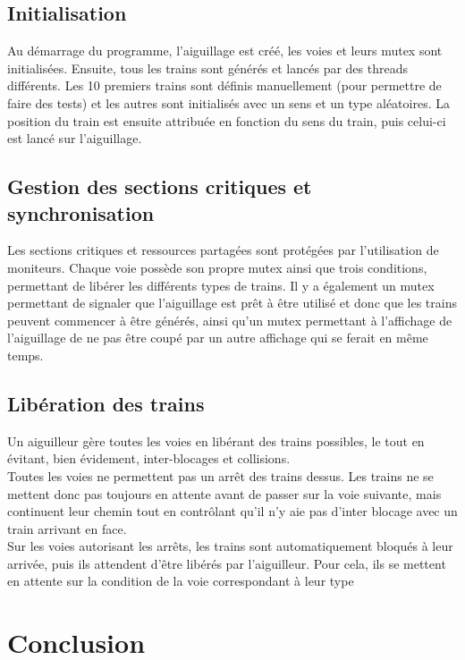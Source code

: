 \documentclass[a4paper, 12pt]{report}
\begin{document}
\section{Initialisation}
Au démarrage du programme, l'aiguillage est créé, les voies et leurs mutex sont initialisées.
Ensuite, tous les trains sont générés et lancés par des threads différents.
Les 10 premiers trains sont définis manuellement (pour permettre de faire des tests) et les autres sont initialisés avec un sens et un type aléatoires.
La position du train est ensuite attribuée en fonction du sens du train, puis celui-ci est lancé sur l'aiguillage.

\section{Gestion des sections critiques et synchronisation}
Les sections critiques et ressources partagées sont protégées par l'utilisation de moniteurs. 
Chaque voie possède son propre mutex ainsi que trois conditions, 
permettant de libérer les différents types de trains. 
Il y a également un mutex permettant de signaler que l'aiguillage est prêt à être utilisé 
et donc que les trains peuvent commencer à être générés, 
ainsi qu'un mutex permettant à l'affichage de l'aiguillage de ne pas être coupé 
par un autre affichage qui se ferait en même temps. 

\section{Libération des trains}
Un aiguilleur gère toutes les voies en libérant des trains possibles, 
le tout en évitant, bien évidement, inter-blocages et collisions. \\

Toutes les voies ne permettent pas un arrêt des trains dessus. 
Les trains ne se mettent donc pas toujours en attente avant de passer sur la voie suivante, 
mais continuent leur chemin tout en contrôlant qu'il n'y aie pas d'inter blocage avec un train arrivant en face.\\
Sur les voies autorisant les arrêts, les trains sont automatiquement bloqués à leur arrivée, puis ils attendent d'être libérés par l'aiguilleur.
Pour cela, ils se mettent en attente sur la condition de la voie correspondant à leur type 

\chapter*{Conclusion}
\end{document}
